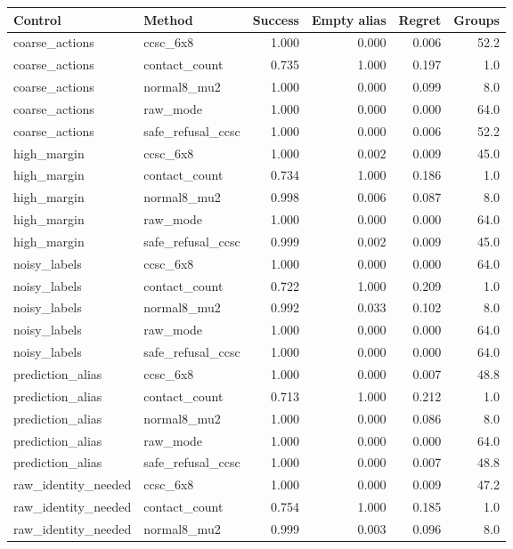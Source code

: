 \begin{tabular}{llrrrr}
\toprule
Control & Method & Success & Empty alias & Regret & Groups \\
\midrule
coarse\_actions & ccsc\_6x8 & 1.000 & 0.000 & 0.006 & 52.2 \\
coarse\_actions & contact\_count & 0.735 & 1.000 & 0.197 & 1.0 \\
coarse\_actions & normal8\_mu2 & 1.000 & 0.000 & 0.099 & 8.0 \\
coarse\_actions & raw\_mode & 1.000 & 0.000 & 0.000 & 64.0 \\
coarse\_actions & safe\_refusal\_ccsc & 1.000 & 0.000 & 0.006 & 52.2 \\
high\_margin & ccsc\_6x8 & 1.000 & 0.002 & 0.009 & 45.0 \\
high\_margin & contact\_count & 0.734 & 1.000 & 0.186 & 1.0 \\
high\_margin & normal8\_mu2 & 0.998 & 0.006 & 0.087 & 8.0 \\
high\_margin & raw\_mode & 1.000 & 0.000 & 0.000 & 64.0 \\
high\_margin & safe\_refusal\_ccsc & 0.999 & 0.002 & 0.009 & 45.0 \\
noisy\_labels & ccsc\_6x8 & 1.000 & 0.000 & 0.000 & 64.0 \\
noisy\_labels & contact\_count & 0.722 & 1.000 & 0.209 & 1.0 \\
noisy\_labels & normal8\_mu2 & 0.992 & 0.033 & 0.102 & 8.0 \\
noisy\_labels & raw\_mode & 1.000 & 0.000 & 0.000 & 64.0 \\
noisy\_labels & safe\_refusal\_ccsc & 1.000 & 0.000 & 0.000 & 64.0 \\
prediction\_alias & ccsc\_6x8 & 1.000 & 0.000 & 0.007 & 48.8 \\
prediction\_alias & contact\_count & 0.713 & 1.000 & 0.212 & 1.0 \\
prediction\_alias & normal8\_mu2 & 1.000 & 0.000 & 0.086 & 8.0 \\
prediction\_alias & raw\_mode & 1.000 & 0.000 & 0.000 & 64.0 \\
prediction\_alias & safe\_refusal\_ccsc & 1.000 & 0.000 & 0.007 & 48.8 \\
raw\_identity\_needed & ccsc\_6x8 & 1.000 & 0.000 & 0.009 & 47.2 \\
raw\_identity\_needed & contact\_count & 0.754 & 1.000 & 0.185 & 1.0 \\
raw\_identity\_needed & normal8\_mu2 & 0.999 & 0.003 & 0.096 & 8.0 \\

\end{tabular}
